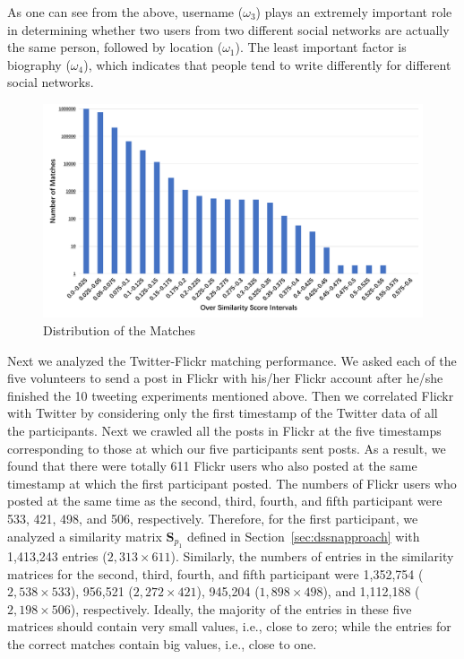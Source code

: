\documentclass[letterpaper,12pt]{article}
\begin{document}
As one can see from the above, username ($\omega_{3}$) plays an extremely important role in determining whether two users from two different social networks are actually the same person, followed by location ($\omega_{1}$).  The least important factor is biography ($\omega_{4}$), which indicates that people tend to write differently for different social networks.

\begin{figure}[t]
  \includegraphics[width=\textwidth]{SN-SN-match.pdf}
  \caption{Distribution of the Matches}
  \label{fig:sn-sn-match}
\end{figure}

Next we analyzed the Twitter-Flickr matching performance. We asked each of the five volunteers to send a post in Flickr with his/her Flickr account after he/she finished the 10 tweeting experiments mentioned above. Then we correlated Flickr with Twitter by considering only the first timestamp of the Twitter data of all the participants. %
Next we crawled all the posts in Flickr at the five timestamps corresponding to those at which our five participants sent posts. As a result, we found that there were totally 611 Flickr users who also posted at the same timestamp at which the first participant posted. The numbers of Flickr users who posted at the same time as the second, third, fourth, and fifth participant were 533, 421, 498, and 506, respectively. Therefore, for the first participant, we analyzed a similarity matrix $\boldsymbol{S}_{p_1}$ defined in Section~\ref{sec:dssnapproach} with 1,413,243 entries ($2,313\times 611$). Similarly, the numbers of entries in the similarity matrices for the second, third, fourth, and fifth participant were 1,352,754 ($2,538\times 533$), 956,521 ($2,272\times 421$), 945,204 ($1,898\times 498$), and 1,112,188 ($2,198\times 506$), respectively. Ideally, the majority of the entries in these five matrices should contain very small values,  i.e., close to zero; while the entries for the  correct matches contain big values, i.e., close to one.
\end{document}
